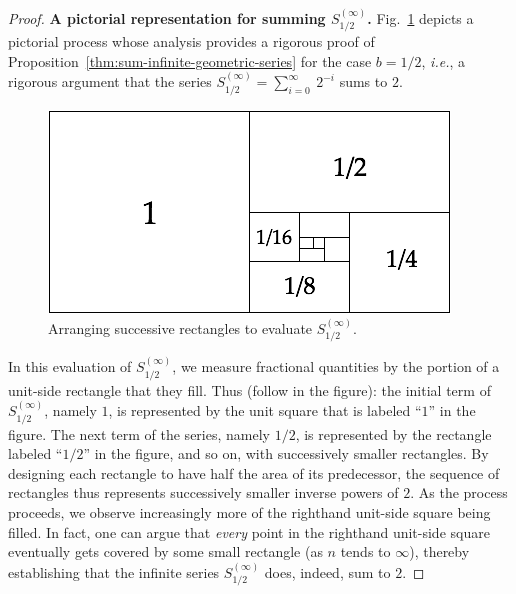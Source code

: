 \begin{proof}
{\bf A pictorial representation for summing $S^{(\infty)}_{1/2}$.}
%
Fig.~\ref{fig:sumGeoBasis} depicts a pictorial process whose analysis
provides a rigorous proof of
Proposition~\ref{thm:sum-infinite-geometric-series} for the case $b =
1/2$, \textit{i.e.}, a rigorous argument that the series $S^{(\infty)}_{1/2} =
\sum_{i=0}^\infty \ 2^{-i}$ sums to $2$.
\begin{figure}[ht]
\begin{center}
       \includegraphics[scale=0.4]{FiguresMaths/SumGeometric1sur2Bis}
 \caption{Arranging successive rectangles to evaluate $S^{(\infty)}_{1/2}$.}
       \label{fig:sumGeoBasis}
\end{center}
\end{figure}
In this evaluation of $S^{(\infty)}_{1/2}$, we measure fractional
quantities by the portion of a unit-side rectangle that they fill.
Thus (follow in the figure): the initial term of $S^{(\infty)}_{1/2}$,
namely $1$, is represented by the unit square that is labeled ``$1$''
in the figure.  The next term of the series, namely $1/2$, is
represented by the rectangle labeled ``$1/2$'' in the figure, and so
on, with successively smaller rectangles.  By designing each rectangle
to have half the area of its predecessor, the sequence of rectangles
thus represents successively smaller inverse powers of $2$.  As the
process proceeds, we observe increasingly more of the righthand
unit-side square being filled.  In fact, one can argue that {\em
  every} point in the righthand unit-side square eventually gets
covered by some small rectangle (as $n$ tends to $\infty$), thereby
establishing that the infinite series $S^{(\infty)}_{1/2}$
does, indeed, sum to $2$.



\end{proof}

